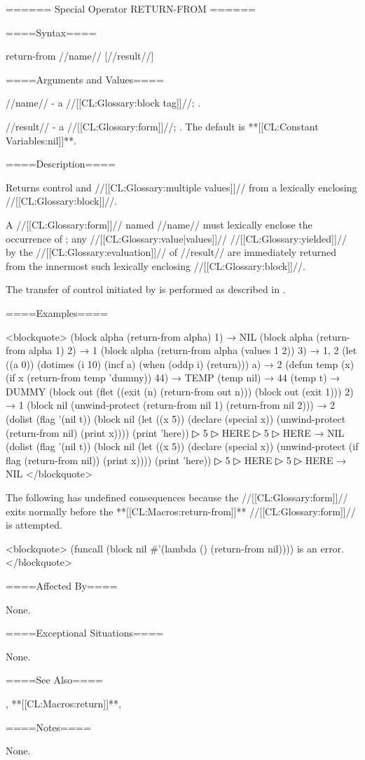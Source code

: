 ====== Special Operator RETURN-FROM ======

====Syntax====

\DefspecNoReturn return-from {//name// [//result//]}

====Arguments and Values====

//name// - a //[[CL:Glossary:block tag]]//; \noeval.

//result// - a //[[CL:Glossary:form]]//; \eval. The default is **[[CL:Constant Variables:nil]]**.

====Description====

Returns control and //[[CL:Glossary:multiple values]]// from a lexically enclosing //[[CL:Glossary:block]]//.

A  //[[CL:Glossary:form]]// named //name// must lexically enclose the occurrence of ; any //[[CL:Glossary:value|values]]// //[[CL:Glossary:yielded]]// by the //[[CL:Glossary:evaluation]]// of //result// are immediately returned from the innermost such lexically enclosing //[[CL:Glossary:block]]//.

The transfer of control initiated by  is performed as described in \secref\TransferOfControl.

====Examples====

<blockquote> (block alpha (return-from alpha) 1) → NIL (block alpha (return-from alpha 1) 2) → 1 (block alpha (return-from alpha (values 1 2)) 3) → 1, 2 (let ((a 0)) (dotimes (i 10) (incf a) (when (oddp i) (return))) a) → 2 (defun temp (x) (if x (return-from temp 'dummy)) 44) → TEMP (temp nil) → 44 (temp t) → DUMMY (block out (flet ((exit (n) (return-from out n))) (block out (exit 1))) 2) → 1 (block nil (unwind-protect (return-from nil 1) (return-from nil 2))) → 2 (dolist (flag '(nil t)) (block nil (let ((x 5)) (declare (special x)) (unwind-protect (return-from nil) (print x)))) (print 'here))
▷ 5
▷ HERE
▷ 5
▷ HERE → NIL (dolist (flag '(nil t)) (block nil (let ((x 5)) (declare (special x)) (unwind-protect (if flag (return-from nil)) (print x)))) (print 'here))
▷ 5
▷ HERE
▷ 5
▷ HERE → NIL </blockquote>

The following has undefined consequences because the  //[[CL:Glossary:form]]// exits normally before the **[[CL:Macros:return-from]]** //[[CL:Glossary:form]]// is attempted.

<blockquote> (funcall (block nil #'(lambda () (return-from nil)))) is an error. </blockquote>

====Affected By====

None.

====Exceptional Situations====

None.

====See Also====

, **[[CL:Macros:return]]**, {\secref\Evaluation}

====Notes====

None.

